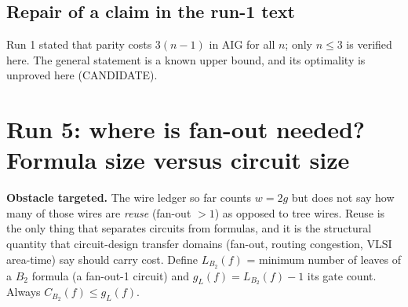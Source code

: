\documentclass[11pt]{article}
\begin{document}
\subsection{Repair of a claim in the run-1 text}
Run 1 stated that parity costs $3(n-1)$ in AIG for all $n$; only $n\le3$ is verified here. The general statement is
a known upper bound, and its optimality is unproved here (CANDIDATE).

\section{Run 5: where is fan-out needed? Formula size versus circuit size}\label{sec:r5}
\textbf{Obstacle targeted.} The wire ledger so far counts $w=2g$ but does not say how many of those wires are \emph{reuse} (fan-out $>1$) as opposed to tree wires. Reuse is the only thing that separates circuits from formulas, and it is the structural quantity that circuit-design transfer domains (fan-out, routing congestion, VLSI area-time) say should carry cost.
Define $L_{B_2}(f)$ = minimum number of leaves of a $B_2$ formula (a fan-out-1 circuit) and $g_L(f)=L_{B_2}(f)-1$ its gate count.
Always $C_{B_2}(f)\le g_L(f)$.
\end{document}
